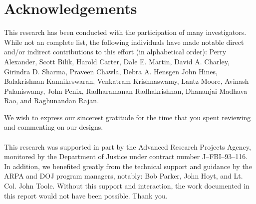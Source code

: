 \documentclass[11pt]{report}
\begin{document}
\chapter*{Acknowledgements}
This research has been conducted with the participation of many
investigators.  While not an complete list, the following individuals
have made notable direct and/or indirect contributions to this effort
(in alphabetical order):
Perry Alexander,
Scott Bilik,
Harold Carter,
Dale E. Martin,
David A. Charley,
Girindra D. Sharma,
Praveen Chawla,
Debra A. Hensgen
John Hines,
Balakrishnan Kannikeswaran,
Venkatram Krishnaswamy,
Lantz Moore,
Avinash Palaniswamy,
John Penix,
Radharamanan Radhakrishnan,
Dhananjai Madhava Rao, and
Raghunandan Rajan.

We wish to express our sincerest gratitude for the time that you spent
reviewing and commenting on our designs.
\\
\\
This research was supported in part by the Advanced Research Projects
Agency, monitored by the Department of Justice under contract number
J--FBI--93--116.  In addition, we benefited greatly from the technical
support and guidance by the ARPA and DOJ program managers, notably: Bob
Parker, John Hoyt, and Lt. Col. John Toole.  Without this support and
interaction, the work documented in this report would not have been
possible.  Thank you.
\end{document}

